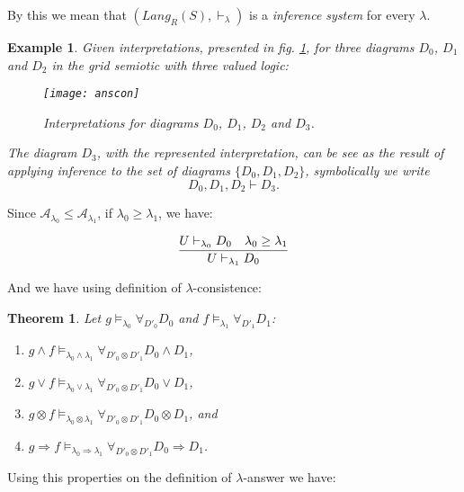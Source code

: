 \documentclass[oribibl]{llncs}
\newtheorem{thm}{Theorem}
\newtheorem{exam}{Example}
\newcommand{\A}{\mathcal{A}}
\begin{document}
By this we mean that $(Lang_R(S),\vdash_\lambda)$ is a
\emph{inference system} \cite{abramsky92}  for every $\lambda$.

\begin{exam}
Given interpretations, presented in fig. \ref{grid4}, for three diagrams $D_0$, $D_1$ and $D_2$ in the grid semiotic with three valued logic:

\begin{figure}[h]
\begin{center}
\texttt{[image: anscon]}
\end{center}
\caption{Interpretations for diagrams $D_0$, $D_1$, $D_2$ and $D_3$.}\label{grid4}
\end{figure}

The diagram $D_3$, with the represented interpretation, can be see as the result of applying inference to the set of diagrams $\{D_0,D_1,D_2\}$, symbolically we write
\[D_0,D_1,D_2\vdash D_3.\]
\end{exam}

Since $\A_{\lambda_0}\leq\A_{\lambda_1}$, if
$\lambda_0\geq\lambda_1$, we have:

\[
\infer{U\vdash_{\lambda_1} D_0}{U\vdash_{\lambda_0} D_0 &
\lambda_0\geq\lambda_1}
\]

And we have using definition of $\lambda$-consistence:

\begin{thm} Let $g\models_{\lambda_0}\forall_{D'_0} D_0$ and $f\models_{\lambda_1}\forall_{D'_1} D_1$:
\begin{enumerate}
  \item $g\wedge f\models_{\lambda_0\wedge\lambda_1}\forall_{D'_0\otimes D'_1} D_0\wedge D_1$,
  \item $g\vee f\models_{\lambda_0\vee\lambda_1}\forall_{D'_0\otimes D'_1} D_0\vee D_1$,
  \item $g\otimes f\models_{\lambda_0\otimes\lambda_1}\forall_{D'_0\otimes D'_1} D_0\otimes D_1$, and
  \item $g\Rightarrow f\models_{\lambda_0\Rightarrow\lambda_1}\forall_{D'_0\otimes D'_1} D_0\Rightarrow D_1$.
\end{enumerate}
\end{thm}

Using this properties on the definition of $\lambda$-answer we have:
\end{document}

